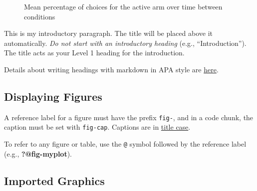 \documentclass[
  letterpaper,
  DIV=11,
  numbers=noendperiod,
  oneside]{scrartcl}
\begin{document}
\begin{figure}


\caption{\label{fig-Exp2-decisions-line}Mean percentage of choices for
the active arm over time between conditions}

\end{figure}%

\newpage

This is my introductory paragraph. The title will be placed above it
automatically. \emph{Do not start with an introductory heading} (e.g.,
``Introduction''). The title acts as your Level 1 heading for the
introduction.

Details about writing headings with markdown in APA style are
\href{https://wjschne.github.io/apaquarto/writing.html\#headings-in-apa-style}{here}.

\subsection{Displaying Figures}\label{displaying-figures}

A reference label for a figure must have the prefix \texttt{fig-}, and
in a code chunk, the caption must be set with \texttt{fig-cap}. Captions
are in
\href{https://apastyle.apa.org/style-grammar-guidelines/capitalization/title-case}{title
case}.

To refer to any figure or table, use the \texttt{@} symbol followed by
the reference label (e.g., \textbf{?@fig-myplot}).

\subsection{Imported Graphics}\label{imported-graphics}
\end{document}
